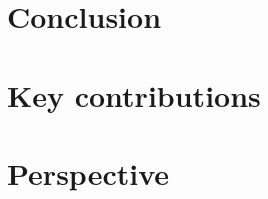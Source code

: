 
\chapter*{Conclusion}\label{section:generalconclusion}
\chapter*{Key contributions}\label{section:keycontributions}
\chapter*{Perspective}\label{section:perspectives}
